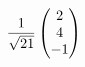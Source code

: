\documentclass[preview]{standalone}
\begin{document}
\begin{align*}
{1 \over \sqrt{21}} \begin{pmatrix} 2 \\ 4 \\ -1 \end{pmatrix}
\end{align*}
\end{document}
